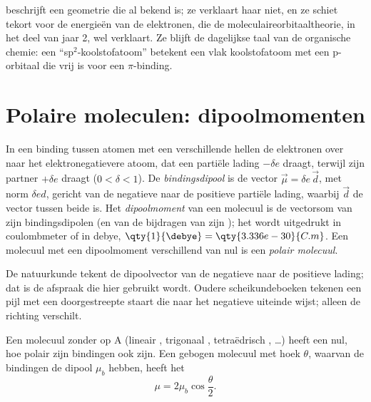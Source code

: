 \begin{remark}\label{rem:b1:lewis-resonance-vsepr:hybrid-limit}
 beschrijft een geometrie die al bekend is; ze verklaart
haar niet, en ze schiet tekort voor de energieën van de elektronen, die
de moleculaireorbitaaltheorie, in het deel van jaar 2, wel verklaart. Ze
blijft de dagelijkse taal van de organische chemie: een
``sp$^2$-koolstofatoom'' betekent een vlak koolstofatoom met een
p-orbitaal die vrij is voor een $\pi$-binding.
\end{remark}

\section{Polaire moleculen: dipoolmomenten}

\begin{definition}\label{def:b1:lewis-resonance-vsepr:dipole}
In een binding tussen atomen met een verschillende 
hellen de elektronen over naar het elektronegatievere atoom, dat een
partiële lading $-\delta e$ draagt, terwijl zijn partner $+\delta e$
draagt ($0 < \delta < 1$). De \emph{bindingsdipool}
is de vector $\vec\mu = \delta e\,
\vec d$, met norm $\delta e d$, gericht van de negatieve naar de positieve
partiële lading, waarbij $\vec d$ de vector tussen beide is. Het
\emph{dipoolmoment} van een molecuul is de
vectorsom van zijn bindingsdipolen (en van de bijdragen van zijn ); het wordt uitgedrukt in coulombmeter of in debye, $\qty{1}{\debye} =
\qty{3.336e-30}{C.m}$. Een molecuul met een dipoolmoment verschillend van
nul is een \emph{polair molecuul}.
\end{definition}


\begin{remark}[Richtingsafspraak]\label{rem:b1:lewis-resonance-vsepr:convention}
De natuurkunde tekent de dipoolvector van de negatieve naar de positieve
lading; dat is de afspraak die hier gebruikt wordt. Oudere
scheikundeboeken tekenen een pijl met een doorgestreepte staart die naar
het negatieve uiteinde wijst; alleen de richting verschilt.
\end{remark}

\begin{proposition}\label{prop:b1:lewis-resonance-vsepr:dipole-sum}
Een molecuul  zonder  op A (lineair ,
trigonaal , tetraëdrisch , \dots) heeft een 
nul, hoe polair zijn bindingen ook zijn. Een gebogen molecuul 
met hoek $\theta$, waarvan de bindingen de dipool $\mu_b$ hebben, heeft
het 
\[
  \mu = 2\mu_b \cos\frac{\theta}{2} .
\]
\end{proposition}


